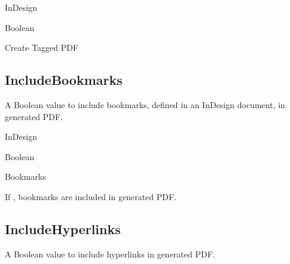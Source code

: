\documentclass[letterpaper,12pt,english,openany,oneside]{sphinxmanual}
\begin{document}
\label{\detokenize{PDF_Create_NewNamespaces:supported-by-11}}

InDesign

\label{\detokenize{PDF_Create_NewNamespaces:type-11}}

Boolean

\label{\detokenize{PDF_Create_NewNamespaces:ui-name-11}}

Create Tagged PDF

\label{\detokenize{PDF_Create_NewNamespaces:default-value-10}}

\begin{sphinxVerbatim}[commandchars=\\\{\}]
\end{sphinxVerbatim}


\subsection{IncludeBookmarks}
\label{\detokenize{PDF_Create_NewNamespaces:includebookmarks}}
A Boolean value to include bookmarks, defined in an InDesign document, in generated PDF.

\label{\detokenize{PDF_Create_NewNamespaces:supported-by-12}}

InDesign

\label{\detokenize{PDF_Create_NewNamespaces:type-12}}

Boolean

\label{\detokenize{PDF_Create_NewNamespaces:ui-name-12}}

Bookmarks

\label{\detokenize{PDF_Create_NewNamespaces:default-value-11}}

\begin{sphinxVerbatim}[commandchars=\\\{\}]
\end{sphinxVerbatim}

If  , bookmarks are included in generated PDF.


\subsection{IncludeHyperlinks}
\label{\detokenize{PDF_Create_NewNamespaces:includehyperlinks}}
A Boolean value to include hyperlinks in generated PDF.
\end{document}
